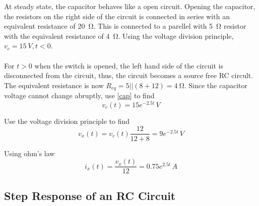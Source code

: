 \documentclass{article}
\begin{document}
\begin{sol}
    At steady state, the capacitor behaves like a open circuit. Opening the capacitor, the resistors on the right side of the circuit is connected in series with an equivalent resistance of \SI{20}{\ohm}. This is connected to a parellel with \SI{5}{\ohm} resistor with the equivalent resistance of \SI{4}{\ohm}. Using the voltage division principle, $v_c=\SI{15}{V}, t<0$.\\\\
    For $t>0$ when the switch is opened, the left hand side of the circuit is disconnected from the circuit, thus, the circuit becomes a source free RC circult. The equivalent resistance is now $R_{eq}=5||(8+12)=\SI{4}{\ohm}$. Since the capacitor voltage cannot change abruptly, use \eqref{cap} to find
    \begin{equation}
        v_c(t)=15 e^{-2.5t}\, \si{V}
    \end{equation}

    Use the voltage division principle to find 
    \begin{equation}
        v_x(t)=v_c(t)\frac{12}{12+8}=9e^{-2.5t}\,\si{V}
    \end{equation}

    Using ohm's law
    \begin{equation}
        i_x(t)=\frac{v_x(t)}{12}=0.75e^{2.5t}\,\si{A}
    \end{equation}
\end{sol}

\subsection{Step Response of an RC Circuit}
\end{document}
